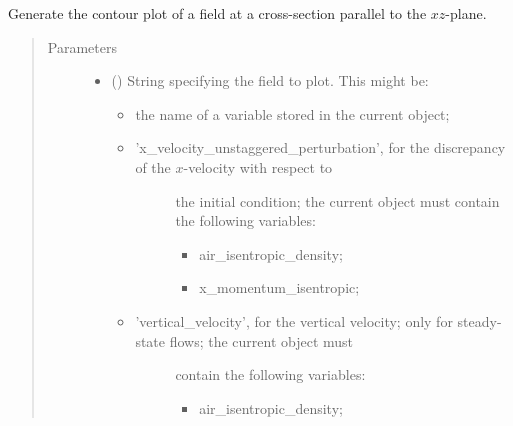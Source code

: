 \documentclass[letterpaper,10pt,english]{sphinxmanual}
\begin{document}
\begin{fulllineitems}
\begin{fulllineitems}
\begin{quote}
\begin{description}
\begin{itemize}
\end{itemize}

\end{description}\end{quote}

\end{fulllineitems}


\begin{fulllineitems}
\label{\detokenize{api:storages.state_isentropic.StateIsentropic.contour_xz}}
Generate the contour plot of a field at a cross-section parallel to the \(xz\)-plane.
\begin{quote}\begin{description}
\item[{Parameters}] \leavevmode\begin{itemize}
\item {} 
 () \textendash{} 
String specifying the field to plot. This might be:
\begin{itemize}
\item {} 
the name of a variable stored in the current object;

\item {} \begin{description}
\item[{’x\_velocity\_unstaggered\_perturbation’, for the discrepancy of the \(x\)-velocity with respect to}] \leavevmode
the initial condition; the current object must contain the following variables:
\begin{itemize}
\item {} 
air\_isentropic\_density;

\item {} 
x\_momentum\_isentropic;

\end{itemize}

\end{description}

\item {} \begin{description}
\item[{’vertical\_velocity’, for the vertical velocity; only for steady-state flows; the current object must}] \leavevmode
contain the following variables:
\begin{itemize}
\item {} 
air\_isentropic\_density;


\end{itemize}
\end{description}
\end{itemize}
\end{itemize}
\end{description}
\end{quote}
\end{fulllineitems}
\end{fulllineitems}
\end{document}
